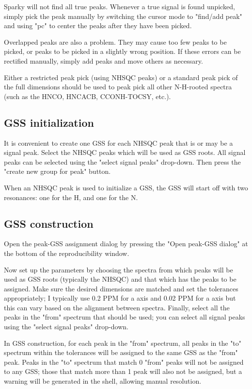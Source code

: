 Sparky will not find all true peaks.  Whenever a true signal is found 
unpicked, simply pick the peak manually by switching the cursor mode to 
"find/add peak" and using "pc" to center the peaks after they have been
picked.

Overlapped peaks are also a problem.  They may cause too few peaks to be 
picked, or peaks to be picked in a slightly wrong position.  If these errors
can be rectified manually, simply add peaks and move others as necessary.

Either a restricted peak pick (using NHSQC peaks) or a standard peak pick
of the full dimensions should be used to peak pick all other N-H-rooted
spectra (such as the HNCO, HNCACB, CCONH-TOCSY, etc.).

\subsection*{GSS initialization}
It is convenient to create one GSS for each NHSQC peak that is or may be
a signal peak.  Select the NHSQC peaks which will be used as GSS roots.  
All signal peaks can be selected using the "select signal peaks" drop-down.
Then press the "create new group for peak" button.

When an NHSQC peak is used to initialize a GSS, the GSS will start off
with two resonances: one for the H, and one for the N.

\subsection*{GSS construction}
Open the peak-GSS assignment dialog by pressing the "Open peak-GSS dialog"
at the bottom of the reproducibility window.

Now set up the parameters by choosing the spectra from which peaks will
be used as GSS roots (typically the NHSQC) and that which has the peaks to
be assigned.  Make sure the desired dimensions are matched and set the 
tolerances appropriately; I typically use 0.2 PPM for a \nmrison{} axis and 0.02 PPM
for a \nmrisoh{} axis but this can vary based on the alignment between spectra.
Finally, select all the peaks in the "from" spectrum that should be used;
you can select all signal peaks using the "select signal peaks" drop-down.

In GSS construction, for each peak in the "from"
spectrum, all peaks in the "to" spectrum within the tolerances will be
assigned to the same GSS as the "from" peak.  Peaks in the "to" spectrum that
match 0 "from" peaks will not be assigned to any GSS; those that match more
than 1 peak will also not be assigned, but a warning will be generated in
the shell, allowing manual resolution.

